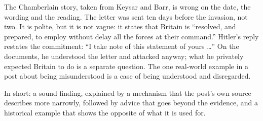 \begin{afterword}
The Chamberlain story, taken from Keysar and Barr, is wrong on the date, the wording and the reading. The letter was sent ten days before the invasion, not two. It is polite, but it is not vague: it states that Britain is ``resolved, and prepared, to employ without delay all the forces at their command.'' Hitler's reply restates the commitment: ``I take note of this statement of yours \ldots'' On the documents, he understood the letter and attacked anyway; what he privately expected Britain to do is a separate question. The one real-world example in a post about being misunderstood is a case of being understood and disregarded.

In short: a sound finding, explained by a mechanism that the post's own source describes more narrowly, followed by advice that goes beyond the evidence, and a historical example that shows the opposite of what it is used for.
\end{afterword}
